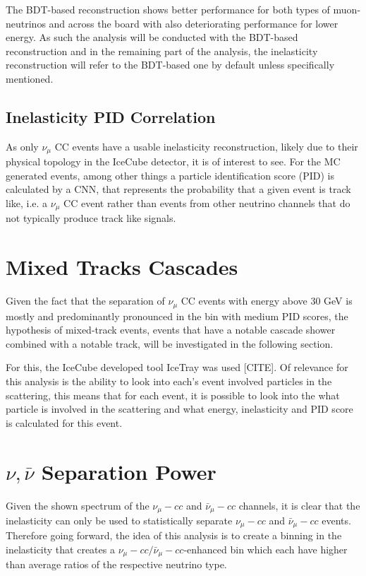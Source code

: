 \documentclass[a4paper,12pt,numbered]{article}
\begin{document}
The BDT-based reconstruction shows better performance for both types of muon-neutrinos and across the board with also deteriorating performance for lower energy. As such the analysis will be conducted with the BDT-based reconstruction and in the remaining part of the analysis, the inelasticity reconstruction will refer to the BDT-based one by default unless specifically mentioned.

\subsection{Inelasticity PID Correlation}

As only $\nu_\mu$ CC events have a usable inelasticity reconstruction, likely due to their physical topology in the IceCube detector, it is of interest to see. For the MC generated events, among other things a particle identification score (PID) is calculated by a CNN, that represents the probability that a given event is track like, i.e. a $\nu_\mu$ CC event rather than events from other neutrino channels that do not typically produce track like signals.

\section{Mixed Tracks Cascades}

Given the fact that the separation of $\nu_\mu$ CC events with energy above 30 GeV is mostly and predominantly pronounced in the bin with medium PID scores, the hypothesis of mixed-track events, events that have a notable cascade shower combined with a notable track, will be investigated in the following section. 

For this, the IceCube developed tool IceTray was used [CITE]. Of relevance for this analysis is the ability to look into each's event involved particles in the scattering, this means that for each event, it is possible to look into the what particle is involved in the scattering and what energy, inelasticity and PID score is calculated for this event.

\section{$\nu, \bar{\nu}$ Separation Power}
Given the shown spectrum of the $\nu_\mu-cc$ and $\bar{\nu}_\mu-cc$ channels, it is clear that the inelasticity can only be used to statistically separate $\nu_\mu-cc$ and $\bar{\nu}_\mu-cc$ events. Therefore going forward, the idea of this analysis is to create a binning in the inelasticity that creates a $\nu_\mu-cc/\bar{\nu}_\mu-cc$-enhanced bin which each have higher than average ratios of the respective neutrino type.
\end{document}
